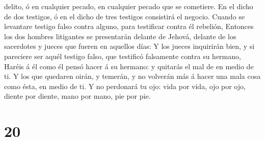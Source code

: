 delito, ó en cualquier pecado, en cualquier pecado que se cometiere. En
el dicho de dos testigos, ó en el dicho de tres testigos consistirá el
negocio.  Cuando se levantare testigo falso contra
alguno, para testificar contra él rebelión,  Entonces los
dos hombres litigantes se presentarán delante de Jehová, delante de los
sacerdotes y jueces que fueren en aquellos días:  Y los
jueces inquirirán bien, y si pareciere ser aquél testigo falso, que
testificó falsamente contra su hermano,  Haréis á él como
él pensó hacer á su hermano: y quitarás el mal de en medio de ti.
 Y los que quedaren oirán, y temerán, y no volverán más á
hacer una mala cosa como ésta, en medio de ti.  Y no
perdonará tu ojo: vida por vida, ojo por ojo, diente por diente, mano
por mano, pie por pie.

\hypertarget{section-19}{%
\section{20}\label{section-19}}

